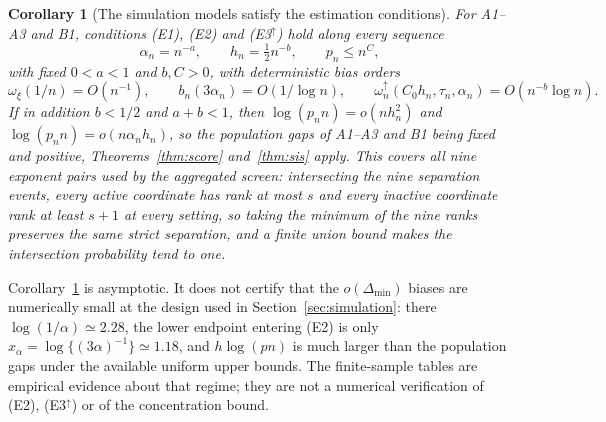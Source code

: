 \documentclass[bj,authoryear]{imsart}
\theoremstyle{plain}
\newtheorem{corollary}[theorem]{Corollary}
\begin{document}
\begin{appendix}
\begin{corollary}[The simulation models satisfy the estimation
conditions]\label{cor:app-models}
For A1--A3 and B1, conditions (E1), (E2) and (E3$^\uparrow$) hold along
every sequence
\[
 \alpha_n=n^{-a},\qquad h_n=\tfrac12n^{-b},\qquad p_n\le n^{C},
\]
with fixed $0<a<1$ and $b,C>0$, with deterministic bias orders
\[
 \omega_\xi(1/n)=O(n^{-1}),
 \qquad
 b_n(3\alpha_n)=O(1/\log n),
 \qquad
 \omega_n^{\uparrow}(C_0h_n,\tau_n,\alpha_n)=O(n^{-b}\log n).
\]
If in addition $b<1/2$ and $a+b<1$, then
$\log(p_nn)=o(nh_n^2)$ and $\log(p_nn)=o(n\alpha_nh_n)$, so the
population gaps of A1--A3 and B1 being fixed and positive,
Theorems~\ref{thm:score} and~\ref{thm:sis} apply. This covers all nine
exponent pairs used by the aggregated screen: intersecting the nine
separation events, every active coordinate has rank at most $s$ and
every inactive coordinate rank at least $s+1$ at every setting, so
taking the minimum of the nine ranks preserves the same strict
separation, and a finite union bound makes the intersection probability
tend to one.
\end{corollary}

\begin{remark}\label{rem:app-finite}
Corollary~\ref{cor:app-models} is asymptotic. It does not certify that
the $o(\Delta_{\min})$ biases are numerically small at the design used
in Section~\ref{sec:simulation}: there $\log(1/\alpha)\simeq2.28$, the
lower endpoint entering (E2) is only
$x_\alpha=\log\{(3\alpha)^{-1}\}\simeq1.18$, and $h\log(pn)$ is much
larger than the population gaps under the available uniform upper
bounds. The finite-sample tables are empirical evidence about that
regime; they are not a numerical verification of (E2), (E3$^\uparrow$)
or of the concentration bound.
\end{remark}

\end{appendix}



\end{document}
